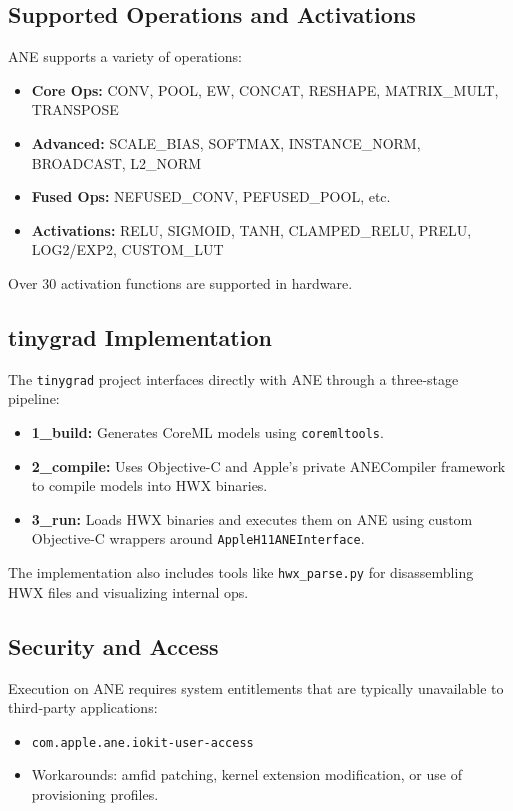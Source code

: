 \subsection{Supported Operations and Activations}

ANE supports a variety of operations:

\begin{itemize}
  \item \textbf{Core Ops:} CONV, POOL, EW, CONCAT, RESHAPE, MATRIX\_MULT, TRANSPOSE
  \item \textbf{Advanced:} SCALE\_BIAS, SOFTMAX, INSTANCE\_NORM, BROADCAST, L2\_NORM
  \item \textbf{Fused Ops:} NEFUSED\_CONV, PEFUSED\_POOL, etc.
  \item \textbf{Activations:} RELU, SIGMOID, TANH, CLAMPED\_RELU, PRELU, LOG2/EXP2, CUSTOM\_LUT
\end{itemize}

Over 30 activation functions are supported in hardware.

\subsection{tinygrad Implementation}

The \texttt{tinygrad} project interfaces directly with ANE through a three-stage pipeline:

\begin{itemize}
  \item \textbf{1\_build:} Generates CoreML models using \texttt{coremltools}.
  \item \textbf{2\_compile:} Uses Objective-C and Apple's private ANECompiler framework to compile models into HWX binaries.
  \item \textbf{3\_run:} Loads HWX binaries and executes them on ANE using custom Objective-C wrappers around \texttt{AppleH11ANEInterface}.
\end{itemize}

The implementation also includes tools like \texttt{hwx\_parse.py} for disassembling HWX files and visualizing internal ops.

\subsection{Security and Access}

Execution on ANE requires system entitlements that are typically unavailable to third-party applications:

\begin{itemize}
  \item \texttt{com.apple.ane.iokit-user-access}
  \item Workarounds: amfid patching, kernel extension modification, or use of provisioning profiles.
\end{itemize}

